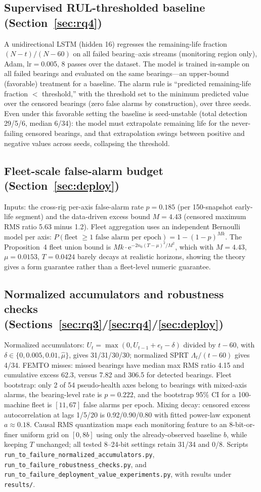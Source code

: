 \documentclass[journal]{IEEEtran}
\begin{document}
\subsection*{Supervised RUL-thresholded baseline (Section~\ref{sec:rq4})}
A unidirectional LSTM (hidden 16) regresses the remaining-life fraction $(N-t)/(N-60)$ on all failed bearing--axis streams (monitoring region only), Adam, lr$=$0.005, 8 passes over the dataset. The model is trained in-sample on all failed bearings and evaluated on the same bearings---an upper-bound (favorable) treatment for a baseline. The alarm rule is ``predicted remaining-life fraction $<$ threshold,'' with the threshold set to the minimum predicted value over the censored bearings (zero false alarms by construction), over three seeds. Even under this favorable setting the baseline is seed-unstable (total detection 29/5/6, median 6/34): the model must extrapolate remaining life for the never-failing censored bearings, and that extrapolation swings between positive and negative values across seeds, collapsing the threshold.

\subsection*{Fleet-scale false-alarm budget (Section~\ref{sec:deploy})}
Inputs: the cross-rig per-axis false-alarm rate $p=0.185$ (per 150-snapshot early-life segment) and the data-driven excess bound $M=4.43$ (censored maximum RMS ratio 5.63 minus 1.2). Fleet aggregation uses an independent Bernoulli model per axis: $P(\text{fleet $\geq$1 false alarm per epoch})=1-(1-p)^{Mk}$. The Proposition~4 fleet union bound is $Mk\cdot\mathrm{e}^{-2n_0(T-\mu)^2/M^2}$, which with $M=4.43$, $\mu=0.0153$, $T=0.0424$ barely decays at realistic horizons, showing the theory gives a form guarantee rather than a fleet-level numeric guarantee.

\subsection*{Normalized accumulators and robustness checks (Sections~\ref{sec:rq3}/\ref{sec:rq4}/\ref{sec:deploy})}
Normalized accumulators: $U_t=\max(0,U_{t-1}+e_t-\delta)$ divided by $t-60$, with $\delta\in\{0,0.005,0.01,\hat\mu\}$, gives 31/31/30/30; normalized SPRT $\Lambda_t/(t-60)$ gives 4/34. FEMTO misses: missed bearings have median max RMS ratio 4.15 and cumulative excess 62.3, versus 7.82 and 306.5 for detected bearings. Fleet bootstrap: only 2 of 54 pseudo-health axes belong to bearings with mixed-axis alarms, the bearing-level rate is $p=0.222$, and the bootstrap 95\% CI for a 100-machine fleet is $[11,67]$ false alarms per epoch. Mixing decay: censored excess autocorrelation at lags 1/5/20 is 0.92/0.90/0.80 with fitted power-law exponent $a\approx0.18$. Causal RMS quantization maps each monitoring feature to an 8-bit-or-finer uniform grid on $[0,8b]$ using only the already-observed baseline $b$, while keeping $T$ unchanged; all tested 8--24-bit settings retain 31/34 and 0/8. Scripts \texttt{run\_to\_failure\_normalized\_accumulators.py}, \texttt{run\_to\_failure\_robustness\_checks.py}, and \texttt{run\_to\_failure\_deployment\_value\_experiments.py}, with results under \texttt{results/}.
\end{document}
